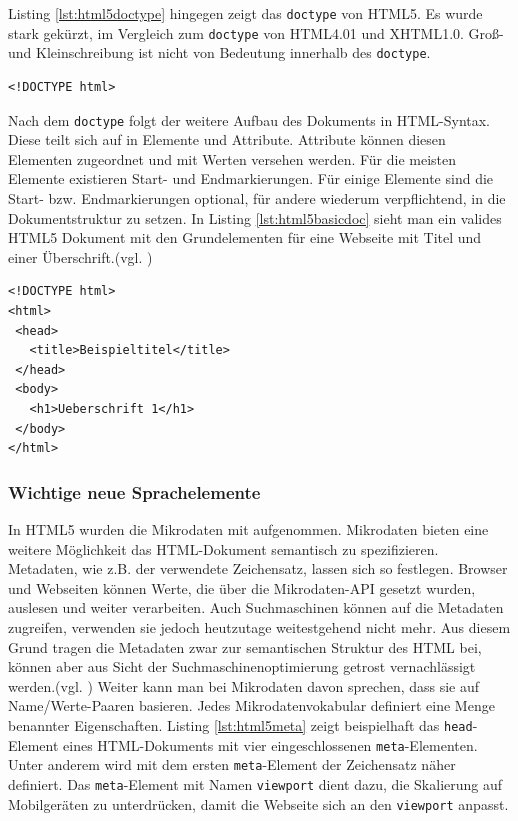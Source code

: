 Listing \ref{lst:html5doctype}	hingegen zeigt das \texttt{doctype} von HTML5. Es wurde stark gekürzt, im Vergleich zum \texttt{doctype} von HTML4.01 und XHTML1.0. Groß- und Kleinschreibung ist nicht von Bedeutung innerhalb des \texttt{doctype}. 

\vspace{1em}
\begin{lstlisting}[language=HTML5, caption=HTML5 \texttt{doctype}, label=lst:html5doctype]
<!DOCTYPE html>
\end{lstlisting}		
	
Nach dem \texttt{doctype} folgt der weitere Aufbau des Dokuments in HTML-Syntax. Diese teilt sich auf in Elemente und Attribute. Attribute können diesen Elementen zugeordnet und mit Werten versehen werden. Für die meisten Elemente existieren Start- und Endmarkierungen. Für einige Elemente sind die Start- bzw. Endmarkierungen optional, für andere wiederum verpflichtend, in die Dokumentstruktur zu setzen. In Listing \ref{lst:html5basicdoc} sieht man ein valides HTML5 Dokument mit den Grundelementen für eine Webseite mit Titel und einer Überschrift.(vgl. \cite[S.58]{KronHTML2011})

\vspace{1em}
\begin{lstlisting}[language=HTML5, caption=HTML5 Basis Dokument, label=lst:html5basicdoc]
<!DOCTYPE html>
<html>
 <head>
   <title>Beispieltitel</title>
 </head>
 <body>
   <h1>Ueberschrift 1</h1>
 </body>
</html>
\end{lstlisting}
	
\subsubsection{Wichtige neue Sprachelemente} In HTML5 wurden die Mikrodaten mit aufgenommen. Mikrodaten bieten eine weitere Möglichkeit das HTML-Dokument semantisch zu spezifizieren. Metadaten, wie z.B. der verwendete Zeichensatz, lassen sich so festlegen. Browser und Webseiten können Werte, die über die Mikrodaten-API gesetzt wurden, auslesen und weiter verarbeiten. Auch Suchmaschinen können auf die Metadaten zugreifen, verwenden sie jedoch heutzutage weitestgehend nicht mehr. Aus diesem Grund tragen die Metadaten zwar zur semantischen Struktur des HTML bei, können aber aus Sicht der Suchmaschinenoptimierung getrost vernachlässigt werden.(vgl. \cite{SelfHtml20142}) Weiter kann man bei Mikrodaten davon sprechen, \glqq [...] dass sie auf Name/Werte-Paaren basieren. Jedes Mikrodatenvokabular definiert eine Menge benannter Eigenschaften.\grqq{}\cite[S.174]{PilgDurc2011} Listing \ref{lst:html5meta} zeigt beispielhaft das \texttt{head}-Element eines HTML-Dokuments mit vier eingeschlossenen \texttt{meta}-Elementen. Unter anderem wird mit dem ersten \texttt{meta}-Element der Zeichensatz näher definiert. Das \texttt{meta}-Element mit Namen \texttt{viewport} dient dazu, die Skalierung auf Mobilgeräten zu unterdrücken, damit die Webseite sich an den \texttt{viewport} anpasst.

